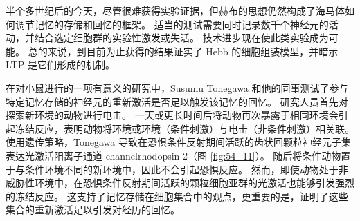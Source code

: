 半个多世纪后的今天，尽管很难获得实验证据，但赫布的思想仍然构成了海马体如何调节记忆的存储和回忆的框架。 适当的测试需要同时记录数千个神经元的活动，并结合选定细胞群的实验性激发或失活。 技术进步现在使此类实验成为可能。 总的来说，到目前为止获得的结果证实了 Hebb 的细胞组装模型，并暗示 LTP 是它们形成的机制。

在对小鼠进行的一项有意义的研究中，Susumu Tonegawa 和他的同事测试了参与特定记忆存储的神经元的重新激活是否足以触发该记忆的回忆。 研究人员首先对探索新环境的动物进行电击。 一天或更长时间后将动物再次暴露于相同环境会引起冻结反应，表明动物将环境或环境（条件刺激）与电击（非条件刺激）相关联。 使用遗传策略，Tonegawa 导致在恐惧条件反射期间活跃的齿状回颗粒神经元子集表达光激活阳离子通道 channelrhodopsin-2（图 \ref{fig:54_11}）。 随后将条件动物置于与条件环境不同的新环境中，因此不会引起恐惧反应。 然而，即使动物处于非威胁性环境中，在恐惧条件反射期间活跃的颗粒细胞亚群的光激活也能够引发强烈的冻结反应。 这支持了记忆存储在细胞集合中的观点，更重要的是，证明了这些集合的重新激活足以引发对经历的回忆。

